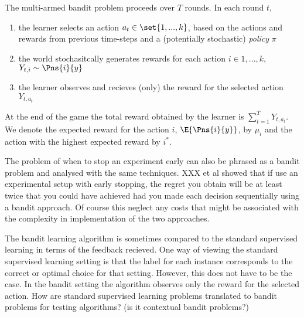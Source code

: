 \vspace{0.5cm}
\begin{definition}
\end{definition}

\vspace{0.5cm}
\begin{definition}
The multi-armed bandit problem proceeds over $T$ rounds. In each round $t$, 
\begin{enumerate}
\item the learner selects an action $a_{t} \in \set{1,...,k}$, based on the actions and rewards from previous time-steps and a (potentially stochastic) \emph{policy} $\pi$
\item the world stochasitcally generates rewards for each action $i \in {1,...,k}$, $Y_{t,i} \sim \Pns{i}{y}$
\item the learner observes and recieves (only) the reward for the selected action $Y_{t,a_t}$ 
\end{enumerate}
At the end of the game the total reward obtained by the learner is $\sum_{t=1}^T Y_{t,a_t}$. We denote the expected reward for the action $i$, $\E{ \Pns{i}{y}}$, by $\mu_i$ and the action with the highest expected reward by $i^*$. 
\end{definition} 

The problem of when to stop an experiment early can also be phrased as a bandit problem and analysed with the same techniques. XXX et al showed that if use an experimental setup with early stopping, the regret you obtain will be at least twice that you could have achieved had you made each decision sequentially using a bandit approach. Of course this neglect any costs that might be associated with the complexity in implementation of the two approaches.

The bandit learning algorithm is sometimes compared to the standard supervised learning in terms of the feedback recieved. One way of viewing the standard supervised learning setting is that the label for each instance corresponds to the correct or optimal choice for that setting. However, this does not have to be the case. In the bandit setting the algorithm observes only the reward for the selected action. How are standard supervised learning problems translated to bandit problems for testing algorithms? (is it contextual bandit problems?)

